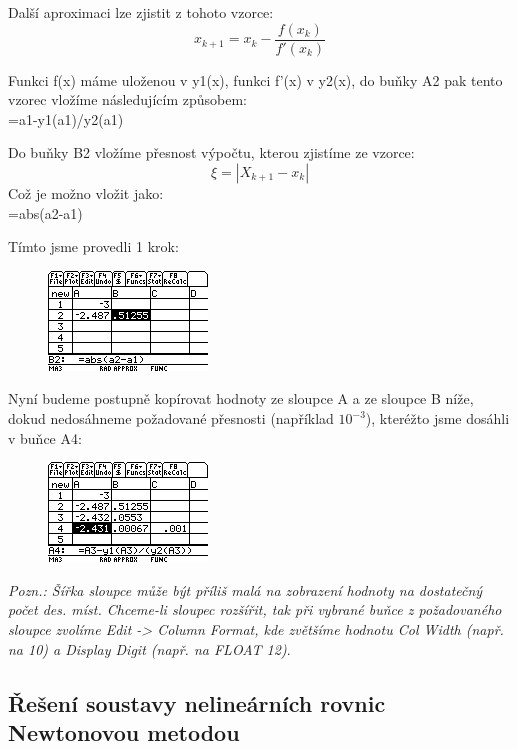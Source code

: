 \documentclass[10pt,a4paper,float]{article}
\begin{document}
Další aproximaci lze zjistit z tohoto vzorce:
\[
	x_{k+1} = x_k - \frac{f(x_k)}{f'(x_k)}
\]

Funkci f(x) máme uloženou v y1(x), funkci f'(x) v y2(x), do buňky A2 pak tento vzorec vložíme následujícím způsobem:\\
=a1-y1(a1)/y2(a1)

Do buňky B2 vložíme přesnost výpočtu, kterou zjistíme ze vzorce:
\[
	\xi = |X_{k+1} - x_k|
\]
Což je možno vložit jako:\\
=abs(a2-a1)

Tímto jsme provedli 1 krok:

\begin{figure}[H]
	\centering
	\includegraphics[width=.5\textwidth]{img/1NEWTON6.PNG}
\end{figure}

Nyní budeme postupně kopírovat hodnoty ze sloupce A a ze sloupce B níže, dokud nedosáhneme požadované přesnosti (například $10^{-3}$), kteréžto jsme dosáhli v buňce A4:


\begin{figure}[H]
	\centering
	\includegraphics[width=.5\textwidth]{img/1NEWTON7.PNG}
\end{figure}

\textit{Pozn.: Šířka sloupce může být příliš malá na zobrazení hodnoty na dostatečný počet des. míst. Chceme-li sloupec rozšířit, tak při vybrané buňce z požadovaného sloupce zvolíme Edit -> Column Format, kde zvětšíme hodnotu Col Width (např. na 10) a Display Digit (např. na FLOAT 12)}.

\subsection{Řešení soustavy nelineárních rovnic Newtonovou metodou}
\end{document}
